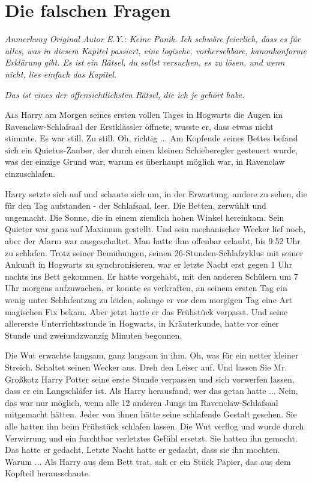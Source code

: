 \chapter{Die falschen Fragen}

\emph{Anmerkung Original Autor E.Y.: Keine Panik. Ich schwöre feierlich, dass es
für alles, was in diesem Kapitel passiert, eine logische, vorhersehbare,
kanonkonforme Erklärung gibt. Es ist ein Rätsel, du sollst versuchen, es zu
lösen, und wenn nicht, lies einfach das Kapitel.}

\emph{\glqq{}Das ist eines der offensichtlichsten Rätsel, die ich je gehört
habe.\grqq{}}

\lettrine{A}{ls} Harry am Morgen seines ersten vollen Tages in Hogwarts die
Augen im Ravenclaw-Schlafsaal der Erstklässler öffnete, wusste er, dass etwas
nicht stimmte. Es war still. Zu still. Oh, richtig ... Am Kopfende seines Bettes
befand sich ein Quietus-Zauber, der durch einen kleinen Schieberegler gesteuert
wurde, was der einzige Grund war, warum es überhaupt möglich war, in Ravenclaw
einzuschlafen.

Harry setzte sich auf und schaute sich um, in der Erwartung, andere zu sehen,
die für den Tag aufstanden - der Schlafsaal, leer. Die Betten, zerwühlt und
ungemacht. Die Sonne, die in einem ziemlich hohen Winkel hereinkam. Sein Quieter
war ganz auf Maximum gestellt. Und sein mechanischer Wecker lief noch, aber der
Alarm war ausgeschaltet. Man hatte ihm offenbar erlaubt, bis 9:52 Uhr zu
schlafen. Trotz seiner Bemühungen, seinen 26-Stunden-Schlafzyklus mit seiner
Ankunft in Hogwarts zu synchronisieren, war er letzte Nacht erst gegen 1 Uhr
nachts ins Bett gekommen. Er hatte vorgehabt, mit den anderen Schülern um 7 Uhr
morgens aufzuwachen, er konnte es verkraften, an seinem ersten Tag ein wenig
unter Schlafentzug zu leiden, solange er vor dem morgigen Tag eine Art magischen
Fix bekam. Aber jetzt hatte er das Frühstück verpasst. Und seine allererste
Unterrichtsstunde in Hogwarts, in Kräuterkunde, hatte vor einer Stunde und
zweiundzwanzig Minuten begonnen.

Die Wut erwachte langsam, ganz langsam in ihm. Oh, was für ein netter kleiner
Streich. Schaltet seinen Wecker aus. Dreh den Leiser auf. Und lassen Sie Mr.
Großkotz Harry Potter seine erste Stunde verpassen und sich vorwerfen lassen,
dass er ein Langschläfer ist. Als Harry herausfand, wer das getan hatte ... Nein,
das war nur möglich, wenn alle 12 anderen Jungs im Ravenclaw-Schlafsaal
mitgemacht hätten. Jeder von ihnen hätte seine schlafende Gestalt gesehen. Sie
alle hatten ihn beim Frühstück schlafen lassen. Die Wut verflog und wurde durch
Verwirrung und ein furchtbar verletztes Gefühl ersetzt. Sie hatten ihn gemocht.
Das hatte er gedacht. Letzte Nacht hatte er gedacht, dass sie ihn mochten.
Warum ... Als Harry aus dem Bett trat, sah er ein Stück Papier, das aus dem
Kopfteil herausschaute.

